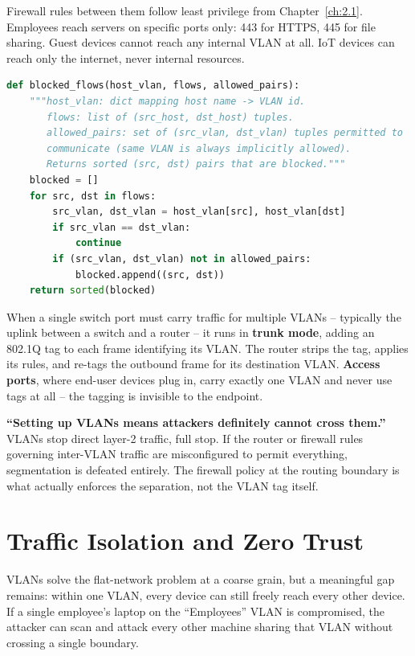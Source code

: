 Firewall rules between them follow least privilege from Chapter~\ref{ch:2.1}. Employees reach
servers on specific ports only: 443 for HTTPS, 445 for file sharing. Guest devices cannot reach any
internal VLAN at all. IoT devices can reach only the internet, never internal resources.

\begin{lstlisting}[language=Python, caption={Determining which traffic flows a VLAN scheme blocks}]
def blocked_flows(host_vlan, flows, allowed_pairs):
    """host_vlan: dict mapping host name -> VLAN id.
       flows: list of (src_host, dst_host) tuples.
       allowed_pairs: set of (src_vlan, dst_vlan) tuples permitted to
       communicate (same VLAN is always implicitly allowed).
       Returns sorted (src, dst) pairs that are blocked."""
    blocked = []
    for src, dst in flows:
        src_vlan, dst_vlan = host_vlan[src], host_vlan[dst]
        if src_vlan == dst_vlan:
            continue
        if (src_vlan, dst_vlan) not in allowed_pairs:
            blocked.append((src, dst))
    return sorted(blocked)
\end{lstlisting}

When a single switch port must carry traffic for multiple VLANs -- typically the uplink between a
switch and a router -- it runs in \textbf{trunk mode}, adding an 802.1Q tag to each frame
identifying its VLAN. The router strips the tag, applies its rules, and re-tags the outbound frame
for its destination VLAN. \textbf{Access ports}, where end-user devices plug in, carry exactly one
VLAN and never use tags at all -- the tagging is invisible to the endpoint.

\begin{misconception}
\textbf{``Setting up VLANs means attackers definitely cannot cross them.''} VLANs stop direct
layer-2 traffic, full stop. If the router or firewall rules governing inter-VLAN traffic are
misconfigured to permit everything, segmentation is defeated entirely. The firewall policy at the
routing boundary is what actually enforces the separation, not the VLAN tag itself.
\end{misconception}

\section{Traffic Isolation and Zero Trust}

VLANs solve the flat-network problem at a coarse grain, but a meaningful gap remains: within one
VLAN, every device can still freely reach every other device. If a single employee's laptop on the
``Employees'' VLAN is compromised, the attacker can scan and attack every other machine sharing
that VLAN without crossing a single boundary.

